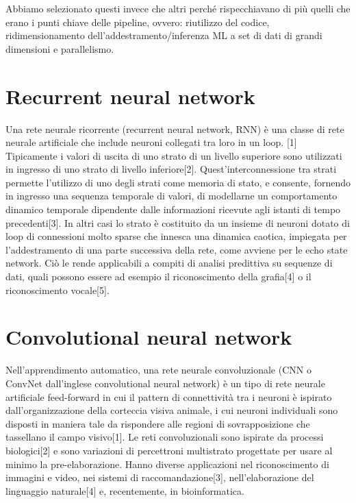 \documentclass[12pt,a4paper]{report}
\begin{document}
Abbiamo selezionato questi invece che altri perché rispecchiavano di più quelli che erano i punti chiave delle pipeline, ovvero: riutilizzo del codice, ridimensionamento dell'addestramento/inferenza ML a set di dati di grandi dimensioni e parallelismo.


\begin{appendices}
\section{Recurrent neural network}
\label{appendix:RNN}
Una rete neurale ricorrente (recurrent neural network, RNN) è una classe di rete neurale artificiale che include neuroni collegati tra loro in un loop. [1] Tipicamente i valori di uscita di uno strato di un livello superiore sono utilizzati in ingresso di uno strato di livello inferiore[2]. Quest'interconnessione tra strati permette l'utilizzo di uno degli strati come memoria di stato, e consente, fornendo in ingresso una sequenza temporale di valori, di modellarne un comportamento dinamico temporale dipendente dalle informazioni ricevute agli istanti di tempo precedenti[3]. In altri casi lo strato è costituito da un insieme di neuroni dotato di loop di connessioni molto sparse che innesca una dinamica caotica, impiegata per l'addestramento di una parte successiva della rete, come avviene per le echo state network. Ciò le rende applicabili a compiti di analisi predittiva su sequenze di dati, quali possono essere ad esempio il riconoscimento della grafia[4] o il riconoscimento vocale[5].

\section{Convolutional neural network}
\label{appendix:CNN}
Nell'apprendimento automatico, una rete neurale convoluzionale (CNN o ConvNet dall'inglese convolutional neural network) è un tipo di rete neurale artificiale feed-forward in cui il pattern di connettività tra i neuroni è ispirato dall'organizzazione della corteccia visiva animale, i cui neuroni individuali sono disposti in maniera tale da rispondere alle regioni di sovrapposizione che tassellano il campo visivo[1]. Le reti convoluzionali sono ispirate da processi biologici[2] e sono variazioni di percettroni multistrato progettate per usare al minimo la pre-elaborazione. Hanno diverse applicazioni nel riconoscimento di immagini e video, nei sistemi di raccomandazione[3], nell'elaborazione del linguaggio naturale[4] e, recentemente, in bioinformatica.
    

\end{appendices}
\end{document}
